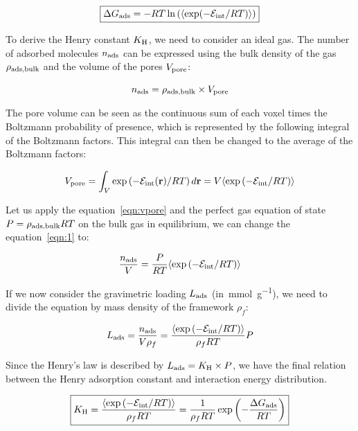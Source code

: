 \documentclass[main.tex]{subfiles}
\begin{document}
\begin{equation}\label{eq:ads_gibbs}
  \boxed{
  \Delta G_{\text{ads}} = -RT \ln\left(\langle \exp(-\mathcal{E}_{\text{int}}/RT) \rangle\right)
  }
\end{equation}

To derive the Henry constant $K_{\text{H}}$, we need to consider an ideal gas. The number of adsorbed molecules $n_{\text{ads}}$ can be expressed using the bulk density of the gas $\rho_{\text{ads,bulk}}$ and the volume of the pores $V_{\text{pore}}$:

\begin{equation}\label{eqn:1}
    n_{\text{ads}} = \rho_{\text{ads,bulk}} \times V_{\text{pore}}  
\end{equation}

The pore volume can be seen as the continuous sum of each voxel times the Boltzmann probability of presence, which is represented by the following integral of the Boltzmann factors. This integral can then be changed to the average of the Boltzmann factors:

\begin{equation}\label{eqn:vpore}
    V_{\text{pore}} = \int_V \exp\left(- \mathcal{E}_{\text{int}}(\textbf{r})/RT\right) d\textbf{r} = V \langle \exp\left(-\mathcal{E}_{\text{int}}/RT\right) \rangle
\end{equation}

Let us apply the equation~\ref{eqn:vpore} and the perfect gas equation of state $P = \rho_{\text{ads,bulk}}RT$ on the bulk gas in equilibrium, we can change the equation~\ref{eqn:1} to:

\begin{equation}
    \dfrac{n_{\text{ads}}}{V} = \dfrac{P}{RT} \langle \exp\left(-\mathcal{E}_{\text{int}}/RT\right) \rangle
\end{equation}

If we now consider the gravimetric loading $L_{\text{ads}}$ (in~\si{\milli\mole\per\gram}), we need to divide the equation by mass density of the framework $\rho_f$:

\begin{equation}
  L_{\text{ads}} = \dfrac{n_{\text{ads}}}{V\rho_f} = \dfrac{\langle \exp\left(-\mathcal{E}_{\text{int}}/RT\right) \rangle}{\rho_fRT} P
\end{equation}

Since the Henry's law is described by $L_{\text{ads}}=K_{\text{H}} \times P$, we have the final relation between the Henry adsorption constant and interaction energy distribution.

\begin{equation}\label{eqn:henry}
    \boxed{
    K_{\text{H}} = \dfrac{\langle \exp\left(-\mathcal{E}_{\text{int}}/RT\right) \rangle}{\rho_fRT} = \dfrac{1}{\rho_fRT} \exp\left(-\dfrac{\Delta G_{\text{ads}}}{RT}\right)
    }
\end{equation}
\end{document}

